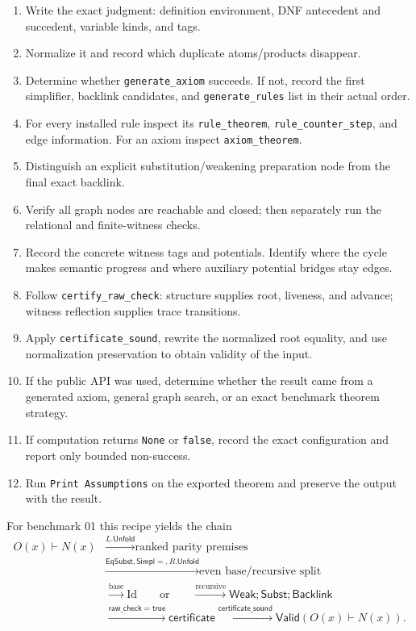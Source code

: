\documentclass[11pt,oneside]{book}
\DeclareRobustCommand{\code}[1]{\nolinkurl{#1}}
\newcommand{\Valid}{\mathsf{Valid}}
\begin{document}
\begin{enumerate}[leftmargin=*]
\item Write the exact judgment: definition environment, DNF antecedent and
succedent, variable kinds, and tags.
\item Normalize it and record which duplicate atoms/products disappear.
\item Determine whether \code{generate_axiom} succeeds.  If not, record the
first simplifier, backlink candidates, and \code{generate_rules} list in their
actual order.
\item For every installed rule inspect its \code{rule_theorem},
\code{rule_counter_step}, and edge information.  For an axiom inspect
\code{axiom_theorem}.
\item Distinguish an explicit substitution/weakening preparation node from the
final exact backlink.
\item Verify all graph nodes are reachable and closed; then separately run the
relational and finite-witness checks.
\item Record the concrete witness tags and potentials.  Identify where the
cycle makes semantic progress and where auxiliary potential bridges stay edges.
\item Follow \code{certify_raw_check}: structure supplies root, liveness, and
advance; witness reflection supplies trace transitions.
\item Apply \code{certificate_sound}, rewrite the normalized root equality,
and use normalization preservation to obtain validity of the input.
\item If the public API was used, determine whether the result came from a
generated axiom, general graph search, or an exact benchmark theorem strategy.
\item If computation returns \code{None} or \code{false}, record the exact
configuration and report only bounded non-success.
\item Run \code{Print Assumptions} on the exported theorem and preserve the
output with the result.
\end{enumerate}

For benchmark 01 this recipe yields the chain
\[
\begin{aligned}
 O(x)\vdash N(x)
 &\xrightarrow{L.\mathsf{Unfold}} \text{ranked parity premises}\\
 &\xrightarrow{\mathsf{EqSubst},\mathsf{Simpl}{=},R.\mathsf{Unfold}}
     \text{even base/recursive split}\\
 &\xrightarrow{\text{base}} \mathrm{Id}
 \qquad\text{or}\qquad
 \xrightarrow{\text{recursive}} \mathsf{Weak};\mathsf{Subst};\mathsf{Backlink}\\
 &\xrightarrow{\mathsf{raw\_check}=\mathsf{true}}
   \mathsf{certificate}
 \xrightarrow{\mathsf{certificate\_sound}}
   \Valid(O(x)\vdash N(x)).
\end{aligned}
\]
\end{document}

